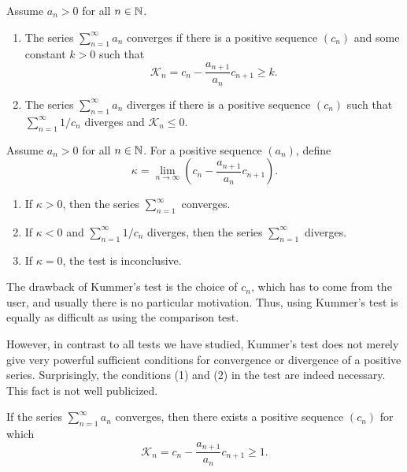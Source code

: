 \begin{proposition}
  Assume $a_n > 0$ for all $n \in \mathbb N$.
  \begin{enumerate}
    \item The series $\sum_{n = 1}^{\infty} a_n$ converges if there
      is a positive sequence $(c_n)$ and some constant $k > 0$ such that
      \[ \mathcal{K}_n = c_n - \frac{a_{n + 1}}{a_n} c_{n + 1} \geq k. \]
    \item The series $\sum_{n = 1}^{\infty} a_n$ diverges if there is
      a positive sequence $(c_n)$ such that $\sum_{n = 1}^{\infty} 1/c_n$
      diverges and $\mathcal{K}_n \leq 0$.
  \end{enumerate}
\end{proposition}

\begin{proposition}
  Assume $a_n > 0$ for all $n \in \mathbb N$. For a positive sequence $(a_n)$, define
  \[ \kappa = \lim_{n \to \infty} \left(c_n - \frac{a_{n + 1}}{a_n}
  c_{n + 1}\right). \]
  \begin{enumerate}
    \item If $\kappa > 0$, then the series $\sum_{n = 1}^{\infty}$ converges.
    \item If $\kappa < 0$ and $\sum_{n = 1}^{\infty} 1/c_n$ diverges,
      then the series $\sum_{n = 1}^{\infty}$ diverges.
    \item If $\kappa = 0$, the test is inconclusive.
  \end{enumerate}
\end{proposition}

\begin{remark}
  The drawback of Kummer's test is the choice of $c_n$, which has to
  come from the user, and usually there is no particular motivation.
  Thus, using Kummer's test is equally as difficult as using the
  comparison test.

  However, in contrast to all tests we have studied, Kummer's test does not
  merely give very powerful sufficient conditions for convergence or
  divergence of a positive series. Surprisingly, the conditions (1)
  and (2) in the test are indeed necessary. This fact is not well publicized.
\end{remark}

\begin{theorem}
  If the series $\sum_{n = 1}^{\infty} a_n$ converges, then there
  exists a positive sequence $(c_n)$ for which
  \[ \mathcal{K}_n = c_n - \frac{a_{n + 1}}{a_n} c_{n + 1} \geq 1. \]
\end{theorem}

